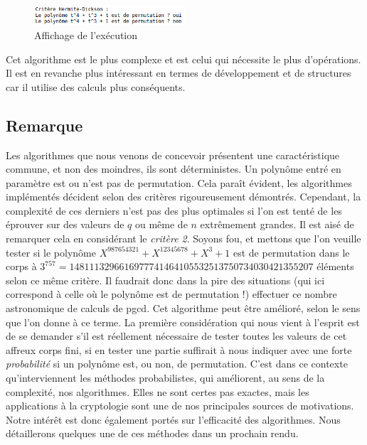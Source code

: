 \documentclass[12pt]{article}
\theoremstyle{definition}
\begin{document}
\begin{figure}[h]
\centering
\includegraphics[width=0.5\textwidth]{appercu4.png}
\caption{Affichage de l'exécution}
\end{figure}

Cet algorithme est le plus complexe et est celui qui nécessite le plus d'opérations. Il est en revanche plus intéressant en termes de développement et de structures car il utilise des calculs plus conséquents.

\subsection*{Remarque}

Les algorithmes que nous venons de concevoir présentent une caractéristique commune, et non des moindres, ils sont déterministes. Un polynôme entré en paramètre est ou n'est pas de permutation. Cela paraît évident, les algorithmes implémentés décident selon des critères rigoureusement démontrés. Cependant, la complexité de ces derniers n'est pas des plus optimales si l'on est tenté de les éprouver sur des valeurs de $q$ ou même de $n$ extrêmement grandes. Il est aisé de remarquer cela en considérant le \textit{critère 2}. Soyons fou, et mettons que l'on veuille tester si le polynôme $X^{987654321} + X^{12345678} + X^3 + 1$ est de permutation dans le corps à $3^{757} = 1481113296616977741464105532513750734030421355207$ éléments selon ce même critère. Il faudrait donc dans la pire des situations (qui ici correspond à celle où le polynôme est de permutation !) effectuer ce nombre astronomique de calculs de pgcd. Cet algorithme peut être amélioré, selon le sens que l'on donne à ce terme. La première considération qui nous vient à l'esprit est de se demander s'il est réellement nécessaire de tester toutes les valeurs de cet affreux corps fini, si en tester une partie suffirait à nous indiquer avec une forte \textit{probabilité} si un polynôme est, ou non, de permutation. C'est dans ce contexte qu'interviennent les méthodes probabilistes, qui améliorent, au sens de la complexité, nos algorithmes. Elles ne sont certes pas exactes, mais les applications à la cryptologie sont une de nos principales sources de motivations. Notre intérêt est donc également portés sur l'efficacité des algorithmes.
Nous détaillerons quelques une de ces méthodes dans un prochain rendu.
\end{document}
